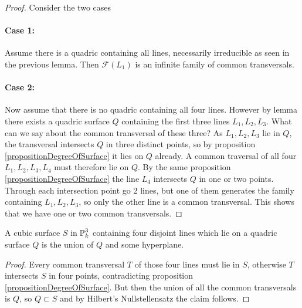 \begin{proof}
Consider the two cases
\paragraph{Case 1:} Assume there is a quadric containing all lines, necessarily irreducible as seen in the previous lemma.
Then $\mathcal F(L_1)$ is an infinite family of common transversals.
\paragraph{Case 2:} Now assume that there is no quadric containing all four lines.
However by lemma \label{lemmaThreeLines} there exists a quadric surface $Q$ containing the first three lines $L_1,L_2,L_3$.
What can we say about the common transversal of these three?
As $L_1,L_2,L_3$ lie in $Q$, the transversal intersects $Q$ in three distinct points, so by proposition \ref{propositionDegreeOfSurface} it lies on $Q$ already.
A common traversal of all four $L_1,L_2,L_3,L_4$ must therefore lie on $Q$.
By the same proposition \ref{propositionDegreeOfSurface} the line $L_4$ intersects $Q$ in one or two points.
Through each intersection point go 2 lines, but one of them generates the family containing $L_1,L_2,L_3$, so only the other line is a common transversal.
This shows that we have one or two common transversals.
\end{proof}

\begin{corollary} \label{corollaryCubicContainsQuadric}
A cubic surface $S$ in $\operatorname{\mathbb P}^3_k$ containing four disjoint lines which lie on a quadric surface $Q$ is the union of $Q$ and some hyperplane.
\end{corollary}
\begin{proof}
Every common transversal $T$ of those four lines must lie in $S$, otherwise $T$ intersects $S$ in four points, contradicting proposition \ref{propositionDegreeOfSurface}.
But then the union of all the common transversals is $Q$, so $Q \subset S$ and by Hilbert's Nullstellensatz the claim follows.
\end{proof}
